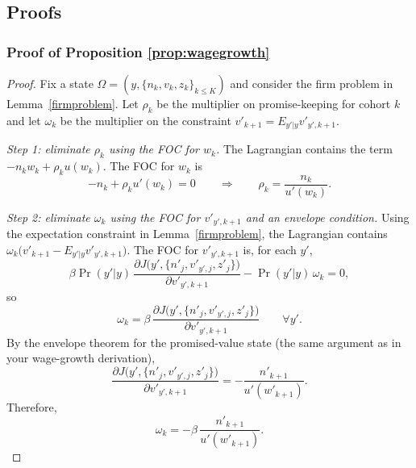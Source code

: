 \subsection{Proofs}

\subsubsection*{Proof of Proposition \ref{prop:wagegrowth}}\label{proof:wagegrowth}
\begin{proof}
Fix a state $\Omega=(y,\{n_k,v_k,z_k\}_{k\le K})$ and consider the firm problem in Lemma~\ref{firmproblem}.
Let $\rho_k$ be the multiplier on promise-keeping for cohort $k$ and let $\omega_k$ be the multiplier on the
constraint $v'_{k+1}=E_{y'|y}v'_{y',k+1}$.

\medskip
\noindent\textit{Step 1: eliminate $\rho_k$ using the FOC for $w_k$.}
The Lagrangian contains the term $-n_kw_k+\rho_k u(w_k)$. The FOC for $w_k$ is
\[
-n_k+\rho_k u'(w_k)=0
\qquad\Rightarrow\qquad
\rho_k=\frac{n_k}{u'(w_k)}.
\]

\medskip
\noindent\textit{Step 2: eliminate $\omega_k$ using the FOC for $v'_{y',k+1}$ and an envelope condition.}
Using the expectation constraint in Lemma~\ref{firmproblem}, the Lagrangian contains
$\omega_k\big(v'_{k+1}-E_{y'|y}v'_{y',k+1}\big)$.
The FOC for $v'_{y',k+1}$ is, for each $y'$,
\[
\beta \Pr(y'|y)\,\frac{\partial J\big(y',\{n'_j,v'_{y',j},z'_j\}\big)}{\partial v'_{y',k+1}}
-\Pr(y'|y)\,\omega_k
=0,
\]
so
\[
\omega_k=\beta\,\frac{\partial J\big(y',\{n'_j,v'_{y',j},z'_j\}\big)}{\partial v'_{y',k+1}}
\qquad \forall y'.
\]
By the envelope theorem for the promised-value state (the same argument as in your wage-growth derivation),
\[
\frac{\partial J\big(y',\{n'_j,v'_{y',j},z'_j\}\big)}{\partial v'_{y',k+1}}
=
-\frac{n'_{k+1}}{u'(w'_{k+1})}.
\]
Therefore,
\[
\omega_k=-\beta\,\frac{n'_{k+1}}{u'(w'_{k+1})}.
\]


\end{proof}
